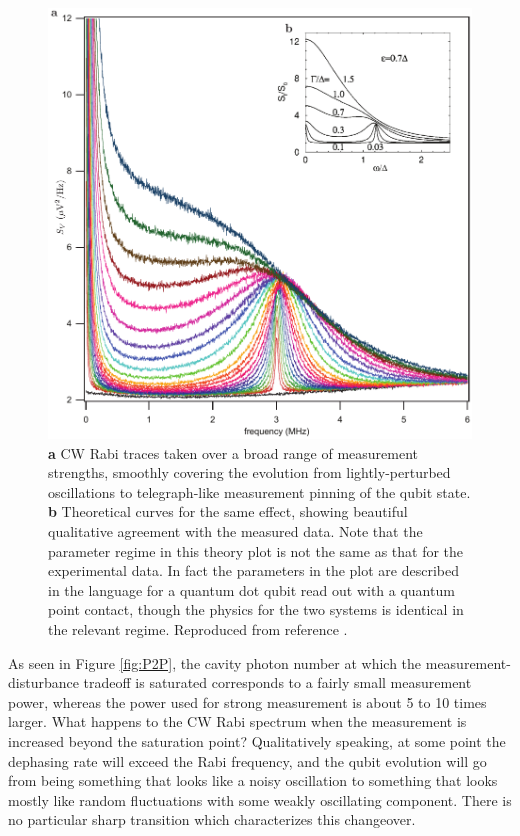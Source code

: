 \begin{figure}
\begin{center}
	\includegraphics[width = 6in]{qfb_results_chapter/zeno}
\end{center}
\caption[CW Rabi spectrum and quantum Zeno effect]{\textbf{a} CW Rabi traces taken over a broad range of measurement strengths, smoothly covering the evolution from lightly-perturbed oscillations to telegraph-like measurement pinning of the qubit state.  \textbf{b} Theoretical curves for the same effect, showing beautiful qualitative agreement with the measured data.  Note that the parameter regime in this theory plot is not the same as that for the experimental data. In fact the parameters in the plot are described in the language for a quantum dot qubit read out with a quantum point contact, though the physics for the two systems is identical in the relevant regime.  Reproduced from reference \cite{korotkov_p2p}.}
\label{fig:zeno}
\end{figure}

As seen in Figure \ref{fig:P2P}, the cavity photon number at which the measurement-disturbance tradeoff is saturated corresponds to a fairly small measurement power, whereas the power used for strong measurement is about 5 to 10 times larger.  What happens to the CW Rabi spectrum when the measurement is increased beyond the saturation point?  Qualitatively speaking, at some point the dephasing rate will exceed the Rabi frequency, and the qubit evolution will go from being something that looks like a noisy oscillation to something that looks mostly like random fluctuations with some weakly oscillating component.  There is no particular sharp transition which characterizes this changeover.


